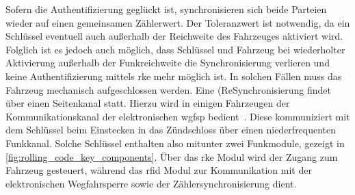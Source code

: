 Sofern die Authentifizierung geglückt ist, synchronisieren sich beide Parteien wieder auf einen gemeinsamen Zählerwert. Der Toleranzwert ist notwendig, da ein Schlüssel eventuell auch außerhalb der Reichweite des Fahrzeuges aktiviert wird. Folglich ist es jedoch auch möglich, dass Schlüssel und Fahrzeug bei wiederholter Aktivierung außerhalb der Funkreichweite die Synchronisierung verlieren und keine Authentifizierung mittels \gls{rke} mehr möglich ist. In solchen Fällen muss das Fahrzeug mechanisch aufgeschlossen werden. Eine (Re\discretionary{-)}{}{)}Synchronisierung findet über einen Seitenkanal statt. Hierzu wird in einigen Fahrzeugen der Kommunikationskanal der elektronischen \gls{wgfsp} bedient~\cite{Garcia2016}. Diese kommuniziert mit dem Schlüssel beim Einstecken in das Zündschloss über einen niederfrequenten Funkkanal. Solche Schlüssel enthalten also mitunter zwei Funkmodule, gezeigt in \cref{fig:rolling_code_key_components}. Über das \gls{rke} Modul wird der Zugang zum Fahrzeug gesteuert, während das \gls{rfid} Modul zur Kommunikation mit der elektronischen Wegfahrsperre sowie der Zählersynchronisierung dient. %

